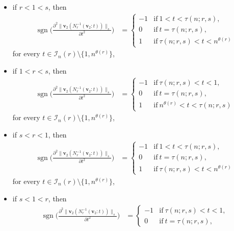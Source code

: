 \documentclass[conference, draftcls, onecolumn]{IEEEtran}
\theoremstyle{plain}
\newcommand{\bvec}[1]{\boldsymbol{#1}}
\newcommand{\sgn}{\operatorname{sgn}}
\newcommand{\lemref}[1]{Lemma~\ref{#1}}
\begin{document}
\begin{IEEEproof}[Proof of \lemref{lem:convex_v}]
\begin{itemize}
\item
if $r < 1 < s$, then
\begin{align}
\sgn \bigg( \frac{ \partial^{2} \| \bvec{v}_{2}( N_{r}^{-1}( \bvec{v}_{2} : t ) ) \|_{s} }{ \partial t^{2} } \bigg)
& =
\begin{cases}
-1
& \mathrm{if} \ 1 < t < \tau(n; r, s) ,
\\
0
& \mathrm{if} \ t = \tau(n; r, s) ,
\\
1
& \mathrm{if} \ \tau(n; r, s) < t < n^{\theta( r )}
\end{cases}
\label{eq:sgn_diff2_norm_r_s_v_2}
\end{align}
for every $t \in \mathcal{I}_{n}( r ) \setminus \{ 1, n^{\theta( r )} \}$,
\item
if $1 < r < s$, then
\begin{align}
\sgn \bigg( \frac{ \partial^{2} \| \bvec{v}_{2}( N_{r}^{-1}( \bvec{v}_{2} : t ) ) \|_{s} }{ \partial t^{2} } \bigg)
& =
\begin{cases}
-1
& \mathrm{if} \ \tau(n; r, s) < t < 1 ,
\\
0
& \mathrm{if} \ t = \tau(n; r, s) ,
\\
1
& \mathrm{if} \ n^{\theta( r )} < t < \tau(n; r, s)
\end{cases}
\label{eq:sgn_diff2_norm_r_s_v_3}
\end{align}
for every $t \in \mathcal{I}_{n}( r ) \setminus \{ 1, n^{\theta( r )} \}$,
\item
if $s < r < 1$, then
\begin{align}
\sgn \bigg( \frac{ \partial^{2} \| \bvec{v}_{2}( N_{r}^{-1}( \bvec{v}_{2} : t ) ) \|_{s} }{ \partial t^{2} } \bigg)
& =
\begin{cases}
-1
& \mathrm{if} \ 1 < t < \tau(n; r, s) ,
\\
0
& \mathrm{if} \ t = \tau(n; r, s) ,
\\
1
& \mathrm{if} \ \tau(n; r, s) < t < n^{\theta( r )}
\end{cases}
\label{eq:sgn_diff2_norm_r_s_v_4}
\end{align}
for every $t \in \mathcal{I}_{n}( r ) \setminus \{ 1, n^{\theta( r )} \}$,
\item
if $s < 1 < r$, then
\begin{align}
\sgn \bigg( \frac{ \partial^{2} \| \bvec{v}_{2}( N_{r}^{-1}( \bvec{v}_{2} : t ) ) \|_{s} }{ \partial t^{2} } \bigg)
& =
\begin{cases}
-1
& \mathrm{if} \ \tau(n; r, s) < t < 1 ,
\\
0
& \mathrm{if} \ t = \tau(n; r, s) ,

\end{cases}
\end{align}
\end{itemize}
\end{IEEEproof}
\end{document}
